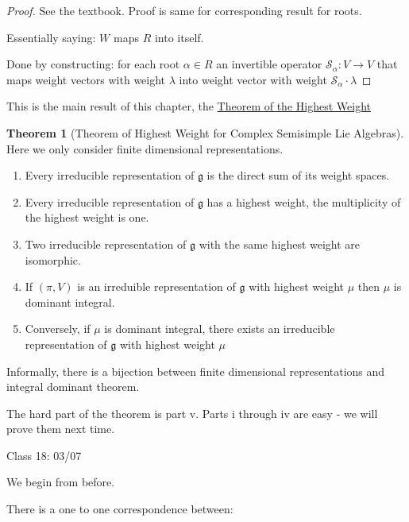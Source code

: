 \documentclass{article}
\theoremstyle{definition}
\newtheorem{theorem}{Theorem}
\begin{document}
\begin{proof}
    See the textbook. Proof is same for corresponding result for roots.

    Essentially saying: \(W\) maps \(R\) into itself.

    Done by constructing: for each root \(\alpha \in R\) an invertible operator \(\mathcal{S}_\alpha : V \to V\) that maps weight vectors with weight \(\lambda\) into weight vector with weight \(\mathcal{S} _\alpha \cdot \lambda\) 
\end{proof}

This is the main result of this chapter, the \underline{Theorem of the Highest Weight}

\begin{theorem}
    [Theorem of Highest Weight for Complex Semisimple Lie Algebras]

    Here we only consider finite dimensional representations.

    \begin{enumerate}
        \item Every irreducible representation of \(\mathfrak{g}\) is the direct sum of its weight spaces.
        \item Every irreducible representation of \(\mathfrak{g}\) has a highest weight, the multiplicity of the highest weight is one.
        \item Two irreducible representation of \(\mathfrak{g}\) with the same highest weight are isomorphic.
        \item If \((\pi ,V)\) is an irreduible representation of \(\mathfrak{g}\) with highest weight \(\mu\) then \(\mu\) is dominant integral.
        \item Conversely, if \(\mu\) is dominant integral, there exists an irreducible representation of \(\mathfrak{g}\) with highest weight \(\mu\)
    \end{enumerate}

    Informally, there is a bijection between finite dimensional representations and integral dominant theorem.

    The hard part of the theorem is part v. Parts i through iv are easy - we will prove them next time.

\end{theorem}

\hrulefill

Class 18: 03/07

We begin from before.

There is a one to one correspondence between:
\end{document}
